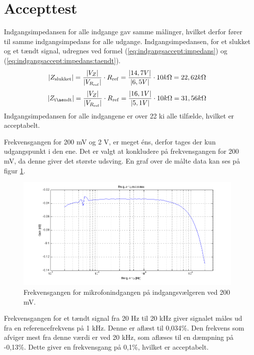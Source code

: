 \section{Accepttest}
Indgangsimpedansen for alle indgange gav samme målinger, hvilket derfor fører til samme indgangsimpedans for alle udgange. Indgangsimpedansen, for et slukket og et tændt signal, udregnes ved formel (\ref{eq:indgangsaccept:impedans}) og (\ref{eq:indgangsaccept:impedans:taendt}).
\begin{equation}
\label{eq:indgangsaccept:impedans:slukket}
\vert Z_\mathrm{slukket} \vert = \frac{\vert V_Z \vert}{\vert V_{R_\mathrm{ref}} \vert} \cdot R_\mathrm{ref} = \frac{\vert 14,7 V\vert}{\vert 6,5 V \vert} \cdot 10 k\ohm = 22,62 k\ohm
\end{equation}
\begin{equation}
\label{eq:indgangsaccept:impedans:taendt}
\vert Z_\mathrm{tændt} \vert = \frac{\vert V_Z \vert}{\vert V_{R_\mathrm{ref}} \vert} \cdot R_\mathrm{ref} = \frac{\vert 16,1 V\vert}{\vert 5,1 V \vert} \cdot 10 k\ohm = 31,56 k\ohm
\end{equation}
Indgangsimpedansen for alle indgangene er over 22 k\ohm i alle tilfælde, hvilket er acceptabelt. 

Frekvensgangen for 200 mV og 2 V, er meget éns, derfor tages der kun udgangspunkt i den ene. Det er valgt at konkludere på frekvensgangen for 200 mV, da denne giver det største udsving. En graf over de målte data kan ses på figur \ref{fig:indacc:frek200mv}.
\begin{figure}[h]
\centering
\includegraphics[width=\textwidth]{maalerapporter/indgangsvaelger/Indgangsvlger mic 200mv frek.png}
\caption{Frekvensgangen for mikrofonindgangen på indgangsvælgeren ved 200 mV.}
\label{fig:indacc:frek200mv}
\end{figure}

Frekvensgangen for et tændt signal fra 20 Hz til 20 kHz giver signalet måles ud fra en referencefrekvens på 1 kHz. Denne er aflæst til 0,034\%. Den frekvens som afviger mest fra denne værdi er ved 20 kHz, som aflæses til en dæmpning på -0,13\%. Dette giver en frekvensgang på 0,1\%, hvilket er acceptabelt.

